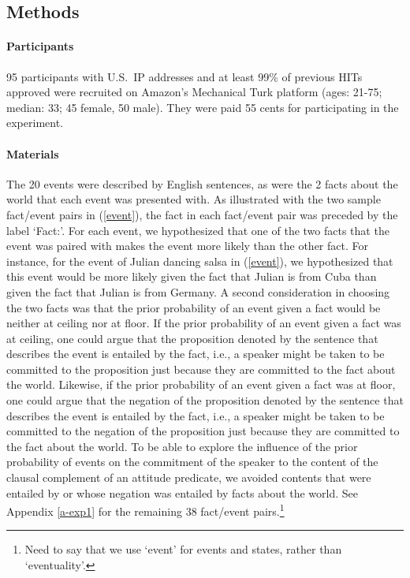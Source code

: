 \documentclass[11pt,fleqn]{article}
\newcommand{\6}{\mbox{$[\hspace*{-.6mm}[$}}
\newcommand{\9}{\mbox{$]\hspace*{-.6mm}]$}}
\begin{document}
\subsection{Methods}\label{s-methods-1}

\paragraph{Participants} 95 participants with U.S.\ IP addresses and at least 99\% of previous HITs approved were recruited on Amazon's Mechanical Turk platform (ages: 21-75; median: 33; 45 female, 50 male). They were paid 55 cents for participating in the experiment. 

\paragraph{Materials} The 20 events were described by English sentences, as were the 2 facts about the world that each event was presented with. As illustrated with the two sample fact/event pairs in (\ref{event}), the fact in each fact/event pair was preceded by the label `Fact:'.  For each event, we hypothesized that one of the two facts that the event was paired with makes the event more likely than the other fact. For instance, for the event of Julian dancing salsa in (\ref{event}), we hypothesized that this event would be more likely given the fact that Julian is from Cuba than given the fact that Julian is from Germany. A second consideration in choosing the two facts was that the prior probability of an event given a fact would be neither at ceiling nor at floor. If the prior probability of an event given a fact was at ceiling, one could argue that the proposition denoted by the sentence that describes the event is entailed by the fact, i.e., a speaker might be taken to be committed to the proposition just because they are committed to the fact about the world. Likewise, if the prior probability of an event given a fact was at floor, one could argue that the negation of the proposition denoted by the sentence that describes the event is entailed by the fact, i.e., a speaker might be taken to be committed to the negation of the proposition just because they are committed to the fact about the world. To be able to explore the influence of the prior probability of events on the commitment of the speaker to the content of the clausal complement of an attitude predicate, we avoided contents that were entailed by or whose negation was entailed by facts about the world. See Appendix \ref{a-exp1} for the remaining 38 fact/event pairs.\footnote{Need to say that we use `event' for events and states, rather than `eventuality'.}
\end{document}
